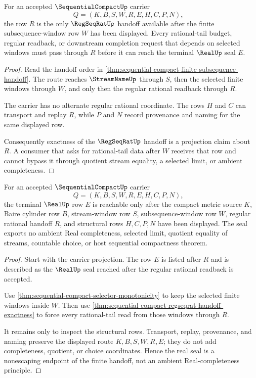 \begin{theorem}
\label{thm:sequential-compact-regseqrat-handoff-exactness}
For an accepted $\SequentialCompactUp$ carrier
$$
Q=(K,B,S,W,R,E,H,C,P,N),
$$
the row $R$ is the only $\RegSeqRatUp$ handoff available after the finite subsequence-window row $W$ has been displayed. Every rational-tail budget, regular readback, or downstream completion request that depends on selected windows must pass through $R$ before it can reach the terminal $\RealUp$ seal $E$.
\end{theorem}
\begin{proof}
Read the handoff order in \autoref{thm:sequential-compact-finite-subsequence-handoff}. The route reaches $\StreamNameUp$ through $S$, then the selected finite windows through $W$, and only then the regular rational readback through $R$.

The carrier has no alternate regular rational coordinate. The rows $H$ and $C$ can transport and replay $R$, while $P$ and $N$ record provenance and naming for the same displayed row.

Consequently exactness of the $\RegSeqRatUp$ handoff is a projection claim about $R$. A consumer that asks for rational-tail data after $W$ receives that row and cannot bypass it through quotient stream equality, a selected limit, or ambient completeness.
\end{proof}

\begin{theorem}
\label{thm:sequential-compact-real-seal-nonescape}
For an accepted $\SequentialCompactUp$ carrier
$$
Q=(K,B,S,W,R,E,H,C,P,N),
$$
the terminal $\RealUp$ row $E$ is reachable only after the compact metric source $K$, Baire cylinder row $B$, stream-window row $S$, subsequence-window row $W$, regular rational handoff $R$, and structural rows $H,C,P,N$ have been displayed. The seal exports no ambient Real completeness, selected limit, quotient equality of streams, countable choice, or host sequential compactness theorem.
\end{theorem}
\begin{proof}
Start with the carrier projection. The row $E$ is listed after $R$ and is described as the $\RealUp$ seal reached after the regular rational readback is accepted.

Use \autoref{thm:sequential-compact-selector-monotonicity} to keep the selected finite windows inside $W$. Then use \autoref{thm:sequential-compact-regseqrat-handoff-exactness} to force every rational-tail read from those windows through $R$.

It remains only to inspect the structural rows. Transport, replay, provenance, and naming preserve the displayed route $K,B,S,W,R,E$; they do not add completeness, quotient, or choice coordinates. Hence the real seal is a nonescaping endpoint of the finite handoff, not an ambient Real-completeness principle.
\end{proof}

